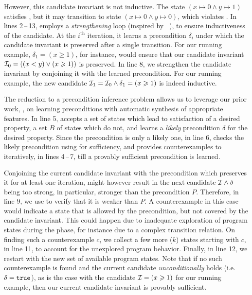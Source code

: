 \documentclass[conference]{IEEEtran}
\begin{document}
However, this candidate invariant is not inductive.
The state $(x \mapsto 0 \wedge y \mapsto 1)$ satisfies \Inv,
but it may transition to state $(x \mapsto 0 \wedge y \mapsto 0)$, which violates \Inv.
In lines 2\,--\,13, \Infer employs a \emph{strengthening} loop (inspired by ~\cite{Dillig2013InductiveIG}),
to ensure inductiveness of the candidate.
At the $i^\text{th}$ iteration, it learns a precondition $\delta_i$
under which the candidate invariant is preserved after a single transition.
For our running example, $\delta_1 = (x \geqslant 1)$, for instance,
would ensure that our candidate invariant $\mathcal{I}_0 = ((x < y) \vee (x \geqslant 1))$ is preserved.
In line 8, we strengthen the candidate invariant by conjoining it with the learned precondition.
For our running example, the new candidate $\mathcal{I}_1 = \mathcal{I}_0 \wedge \delta_1 = (x \geqslant 1)$ is indeed inductive.

The reduction to a precondition inference problem allows us to leverage our prior work, \PIE,
on learning preconditions with automatic synthesis of appropriate features.
In line 5, \PIE accepts a set \States of states which lead to satisfaction of a desired property,
a set $B$ of states which do not, and learns a \emph{likely} precondition $\delta$ for the desired property.
Since the precondition is only a likely one, in line 6, \Infer checks the likely precondition using \Checker for sufficiency,
and provides counterexamples to \PIE iteratively, in lines 4\,--\,7, till a provably sufficient precondition is learned.

Conjoining the current candidate invariant \Inv with the precondition which preserves it for at least one iteration,
might however result in the next candidate $\mathcal{I} \wedge \delta$ being too strong,
in particular, stronger than the precondition $P$.
Therefore, in line 9, we use \Checker to verify that it is weaker than $P$.
A counterexample in this case would indicate a state that is allowed by the precondition,
but not covered by the candidate invariant.
This could happen due to inadequate exploration of program states during the \Record phase,
for instance due to a complex transition relation.
On finding such a counterexample $c$, we collect a few more ($k$) states starting with $c$, in line 11,
to account for the unexplored program behavior.
Finally, in line 12, we restart with the new set of available program states.
Note that if no such counterexample is found and the current candidate \emph{unconditionally} holds (i.e. $\delta = \texttt{true}$),
as is the case with the candidate $\mathcal{I} = (x \geqslant 1)$ for our running example, then
our current candidate invariant is provably sufficient.
\end{document}
